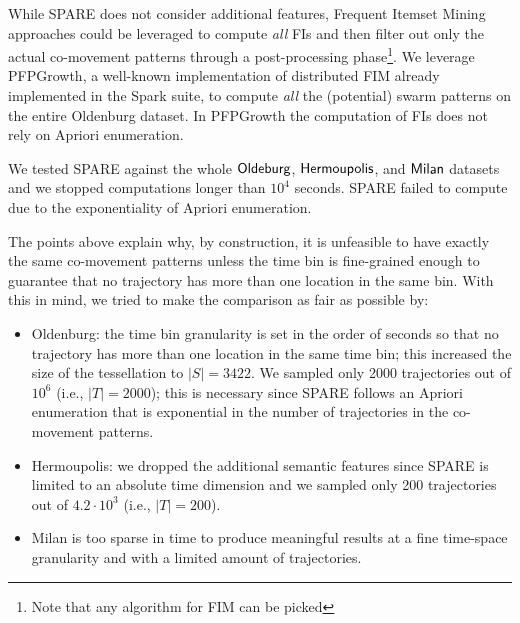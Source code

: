 \documentclass[
]{ceurart}
\renewcommand{\sf}[1]{\textsf{\textup{#1}}}
\newcommand{\mf}[1]{#1}
\begin{document}
\mf{
While SPARE does not consider additional features, Frequent Itemset Mining approaches could be leveraged to compute \textit{all} FIs and then filter out only the actual co-movement patterns through a post-processing phase\footnote{Note that any algorithm for FIM can be picked}.
We leverage PFPGrowth, a well-known implementation of distributed FIM already implemented in the Spark suite, to compute \textit{all} the (potential) swarm patterns on the entire \sf{Oldenburg} dataset.
In PFPGrowth the computation of FIs does not rely on Apriori enumeration. 

We tested SPARE against the whole $\sf{Oldeburg}$, $\sf{Hermoupolis}$, and $\sf{Milan}$ datasets and we stopped computations longer than $10^4$ seconds.
SPARE failed to compute due to the exponentiality of Apriori enumeration.
}
The points above explain why, by construction, it is unfeasible to have exactly the same co-movement patterns unless the time bin is fine-grained enough to guarantee that no trajectory has more than one location in the same bin. With this in mind, we tried to make the comparison as fair as possible by:
\mf{
\begin{itemize}
    \item \sf{Oldenburg}: the time bin granularity is set in the order of seconds so that no trajectory has more than one location in the same time bin; this increased the size of the tessellation to $|S|=3422$. We sampled only 2000 trajectories out of $10^6$ (i.e., $|T|=2000$); this is necessary since SPARE follows an Apriori enumeration that is exponential in the number of trajectories in the co-movement patterns.
    \item \sf{Hermoupolis}: we dropped the additional semantic features since SPARE is limited to an absolute time dimension and we sampled only 200 trajectories out of $4.2 \cdot 10^3$ (i.e., $|T|=200$).
    \item \sf{Milan} is too sparse in time to produce meaningful results at a fine time-space granularity and with a limited amount of trajectories.
\end{itemize}
}
\end{document}
